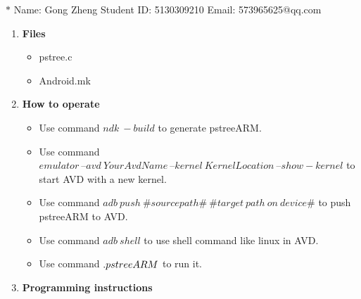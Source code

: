 \documentclass[12pt,a4paper]{article}
\newtheorem*{instruction}{Instruction}
\theoremstyle{definition}
\begin{document}
\noindent

\noindent{}
\begin{center}

\footnotesize{\color{blue}$*$ Name: Gong Zheng  \quad Student ID: 5130309210 \quad Email: 573965625@qq.com}
\end{center}
\begin{enumerate}
	\item \textbf{Files}
	\begin{itemize}
		\item pstree.c
		\item Android.mk
	\end{itemize}

	\item \textbf{How to operate}
	\begin{itemize}
		\item Use command $ndk\ -build$ to generate pstreeARM.
		\item Use command $emulator\ –avd\ YourAvdName\ –kernel\ KernelLocation\ –show-kernel$ to start AVD with a new kernel.
		\item Use command $adb\ push\ \#source path\#\ \#target\ path\ on\ device\#$ to push pstreeARM to AVD.
		\item Use command $adb\ shell$ to use shell command like linux in AVD.
		\item Use command $.\/pstreeARM$ to run it.
	\end{itemize}

	\item \textbf{Programming instructions}

\end{enumerate}
\end{document}
